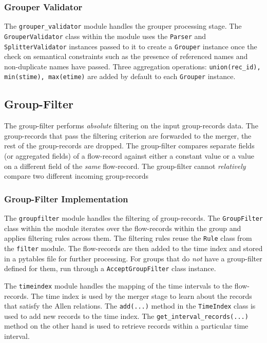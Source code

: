 \subsubsection{Grouper Validator}\label{subsubsec:grouper-validator}
The \texttt{grouper\_validator} module handles the grouper processing stage.
The \texttt{GrouperValidator} class within the module uses the \texttt{Parser} and \texttt{SplitterValidator} instances passed to it to create a \texttt{Grouper} instance once the check on semantical constraints such as the presence of referenced names and non-duplicate names have passed. Three aggregation operations: \texttt{union(rec\_id), min(stime), max(etime)} are added by default to each \texttt{Grouper} instance.

\subsection{Group-Filter}\label{subsec:group-filter}
The group-filter performs \emph{absolute} filtering on the input group-records data. The group-records that pass the filtering criterion are forwarded to the merger, the rest of the group-records are dropped. The group-filter compares separate fields (or aggregated fields) of a flow-record against either a constant value or a value on a different field of the \emph{same} flow-record. The group-filter cannot \emph{relatively} compare two different incoming group-records

\subsubsection{Group-Filter Implementation}\label{subsubsec:group-filter-impl}
The \texttt{groupfilter} module handles the filtering of group-records. The \texttt{GroupFilter} class within the module iterates over the flow-records within the group and applies filtering rules across them. The filtering rules reuse the \texttt{Rule} class from the \texttt{filter} module. The flow-records are then added to the time index and stored in a pytables file for further processing. For groups that do \emph{not} have a group-filter defined for them, run through a \texttt{AcceptGroupFilter} class instance.

The \texttt{timeindex} module handles the mapping of the time intervals to the flow-records. The time index is used by the merger stage to learn about the records that satisfy the Allen relations. The \texttt{add(...)} method in the \texttt{TimeIndex} class is used to add new records to the time index. The \texttt{get\_interval\_records(...)} method on the other hand is used to retrieve records within a particular time interval.

